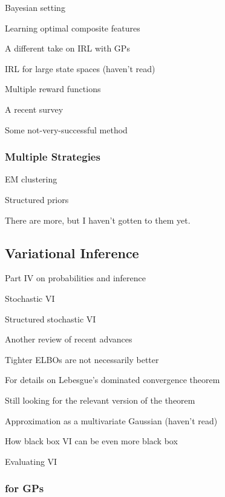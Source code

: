 \documentclass{mprop}
\theoremstyle{definition}
\begin{document}
Bayesian setting \cite{DBLP:conf/ijcai/RamachandranA07}

Learning optimal composite features \cite{DBLP:conf/ijcai/ChoiK13}

A different take on IRL with GPs \cite{DBLP:journals/corr/abs-1208-2112}

IRL for large state spaces (haven't read) \cite{DBLP:journals/jmlr/BoulariasKP11}

Multiple reward functions \cite{DBLP:conf/nips/ChoiK12}

A recent survey \cite{DBLP:journals/corr/abs-1806-06877}

Some not-very-successful method \cite{DBLP:conf/uai/NeuS07}

\subsubsection{Multiple Strategies}

EM clustering \cite{DBLP:conf/icml/BabesMLS11}

Structured priors \cite{DBLP:conf/ewrl/DimitrakakisR11}

There are more, but I haven't gotten to them yet.

\subsection{Variational Inference}

Part IV on probabilities and inference \cite{MacKay:2002:ITI:971143}

Stochastic VI \cite{DBLP:journals/jmlr/HoffmanBWP13}

Structured stochastic VI \cite{DBLP:conf/aistats/HoffmanB15}

Another review of recent advances \cite{DBLP:journals/corr/abs-1711-05597}

Tighter ELBOs are not necessarily better \cite{DBLP:conf/icml/RainforthKLMIWT18}

For details on Lebesgue's dominated convergence theorem \cite{cinlar_probability}

Still looking for the relevant version of the theorem \cite{knill2017probability}

Approximation as a multivariate Gaussian (haven't read) \cite{DBLP:journals/sac/TanN18}

How black box VI can be even more black box \cite{li2016wild}

Evaluating VI \cite{DBLP:conf/icml/YaoVSG18}

\subsubsection{for GPs}
\end{document}
